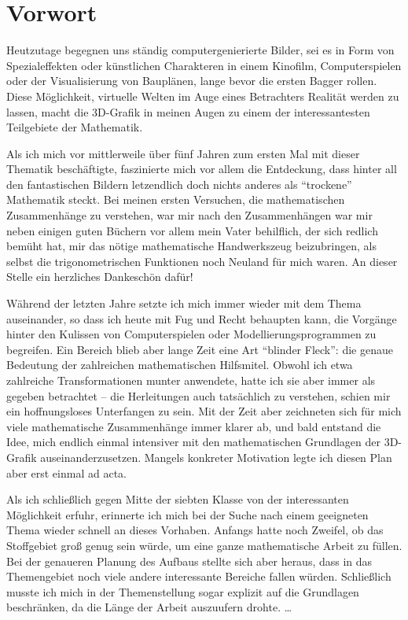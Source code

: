 \chapter*{Vorwort}

Heutzutage begegnen uns ständig computergenierierte Bilder, sei es in Form von Spezialeffekten oder künstlichen Charakteren in einem Kinofilm, Computerspielen oder der Visualisierung von Bauplänen, lange bevor die ersten Bagger rollen. Diese Möglichkeit, virtuelle Welten im Auge eines Betrachters Realität werden zu lassen, macht die 3D-Grafik in meinen Augen zu einem der interessantesten Teilgebiete der Mathematik.

Als ich mich vor mittlerweile über fünf Jahren zum ersten Mal mit dieser Thematik beschäftigte, faszinierte mich vor allem die Entdeckung, dass hinter all den fantastischen Bildern letzendlich doch nichts anderes als \enquote{trockene} Mathematik steckt. Bei meinen ersten Versuchen, die mathematischen Zusammenhänge zu verstehen, war mir nach den Zusammenhängen war mir neben einigen guten Büchern vor allem mein Vater behilflich, der sich redlich bemüht hat, mir das nötige mathematische Handwerkszeug beizubringen, als selbst die trigonometrischen Funktionen noch Neuland für mich waren. An dieser Stelle ein herzliches Dankeschön dafür!

Während der letzten Jahre setzte ich mich immer wieder mit dem Thema auseinander, so dass ich heute mit Fug und Recht behaupten kann, die Vorgänge hinter den Kulissen von Computerspielen oder Modellierungsprogrammen zu begreifen. Ein Bereich blieb aber lange Zeit eine Art \enquote{blinder Fleck}: die genaue Bedeutung der zahlreichen mathematischen Hilfsmitel. Obwohl ich etwa zahlreiche Transformationen munter anwendete, hatte ich sie aber immer als gegeben betrachtet -- die Herleitungen auch tatsächlich zu verstehen, schien mir ein hoffnungsloses Unterfangen zu sein. Mit der Zeit aber zeichneten sich für mich viele mathematische Zusammenhänge immer klarer ab, und bald entstand die Idee, mich endlich einmal intensiver mit den mathematischen Grundlagen der 3D-Grafik auseinanderzusetzen. Mangels konkreter Motivation legte ich diesen Plan aber erst einmal ad acta.

Als ich schließlich gegen Mitte der siebten Klasse von der interessanten Möglichkeit erfuhr, erinnerte ich mich bei der Suche nach einem geeigneten Thema wieder schnell an dieses Vorhaben. Anfangs hatte noch Zweifel, ob das Stoffgebiet groß genug sein würde, um eine ganze mathematische Arbeit zu füllen. Bei der genaueren Planung des Aufbaus stellte sich aber heraus, dass in das Themengebiet noch viele andere interessante Bereiche fallen würden. Schließlich musste ich mich in der Themenstellung sogar explizit auf die Grundlagen beschränken, da die Länge der Arbeit auszuufern drohte. \ldots

